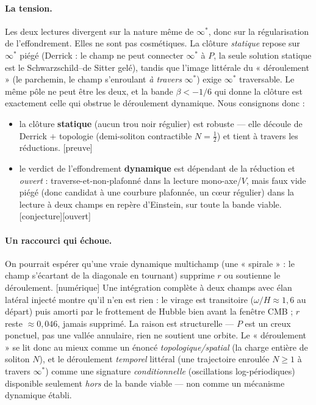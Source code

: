 \documentclass[11pt,a4paper]{article}
\newcommand{\statut}[1]{{\footnotesize\textsf{[#1]}}}
\theoremstyle{definition}
\begin{document}
\paragraph{La tension.} Les deux lectures divergent sur la nature m\^eme de $\infty^*$, donc
sur la r\'egularisation de l'effondrement. Elles ne sont pas cosm\'etiques. La cl\^oture
\emph{statique} repose sur $\infty^*$ pi\'eg\'e (Derrick : le champ ne peut connecter $\infty^*$
\`a $P$, la seule solution statique est le Schwarzschild--de Sitter gel\'e), tandis que l'image
litt\'erale du « d\'eroulement » (le parchemin, le champ s'enroulant \emph{\`a travers}
$\infty^*$) exige $\infty^*$ traversable. Le m\^eme p\^ole ne peut \^etre les deux, et la bande
$\beta<-1/6$ qui donne la cl\^oture est exactement celle qui obstrue le d\'eroulement dynamique.
Nous consignons donc :
\begin{itemize}
\item la cl\^oture \textbf{statique} (aucun trou noir r\'egulier) est robuste --- elle d\'ecoule
de Derrick $+$ topologie (demi-soliton contractible $N=\tfrac12$) et tient \`a travers les
r\'eductions. \statut{preuve}
\item le verdict de l'effondrement \textbf{dynamique} est d\'ependant de la r\'eduction et
\emph{ouvert} : traverse-et-non-plafonn\'e dans la lecture mono-axe/$V$, mais faux vide pi\'eg\'e
(donc candidat \`a une courbure plafonn\'ee, un c\oe ur r\'egulier) dans la lecture \`a deux
champs en repère d'Einstein, sur toute la bande viable. \statut{conjecture}\statut{ouvert}
\end{itemize}

\paragraph{Un raccourci qui \'echoue.} On pourrait esp\'erer qu'une vraie dynamique multichamp
(une « spirale » : le champ s'\'ecartant de la diagonale en tournant) supprime $r$ ou soutienne
le d\'eroulement. \statut{num\'erique} Une int\'egration compl\`ete \`a deux champs avec \'elan
lat\'eral inject\'e montre qu'il n'en est rien : le virage est transitoire ($\omega/H\approx1{,}6$
au d\'epart) puis amorti par le frottement de Hubble bien avant la fen\^etre CMB ; $r$ reste
$\approx0{,}046$, jamais supprim\'e. La raison est structurelle --- $P$ est un creux ponctuel,
pas une vall\'ee annulaire, rien ne soutient une orbite. Le « d\'eroulement » se lit donc au
mieux comme un \'enonc\'e \emph{topologique/spatial} (la charge enti\`ere de soliton $N$), et le
d\'eroulement \emph{temporel} litt\'eral (une trajectoire enroul\'ee $N\ge1$ \`a travers
$\infty^*$) comme une signature \emph{conditionnelle} (oscillations log-p\'eriodiques)
disponible seulement \emph{hors} de la bande viable --- non comme un m\'ecanisme dynamique
\'etabli.
\end{document}
